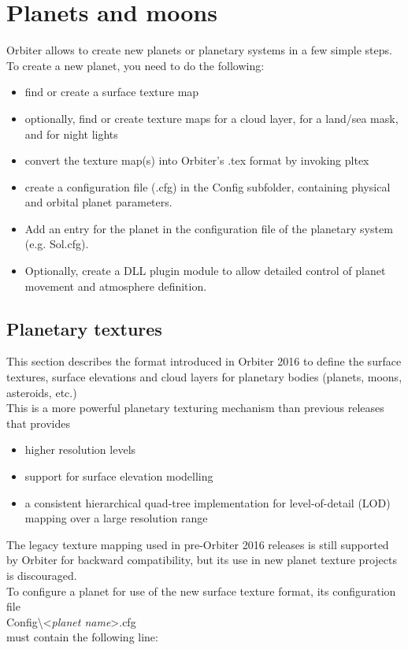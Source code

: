 \documentclass[Orbiter Developer Manual.tex]{subfiles}
\begin{document}
\section{Planets and moons}
Orbiter allows to create new planets or planetary systems in a few simple steps. To create a new planet, you need to do the following:

\begin{itemize}
\item find or create a surface texture map
\item optionally, find or create texture maps for a cloud layer, for a land/sea mask, and for night lights
\item convert the texture map(s) into Orbiter's .tex format by invoking pltex
\item create a configuration file (.cfg) in the Config subfolder, containing physical and orbital planet parameters.
\item Add an entry for the planet in the configuration file of the planetary system (e.g. Sol.cfg).
\item Optionally, create a DLL plugin module to allow detailed control of planet movement and atmosphere definition.
\end{itemize}


\subsection{Planetary textures}
\label{ssec:planetery_tex}
This section describes the format introduced in Orbiter 2016 to define the surface textures, surface elevations and cloud layers for planetary bodies (planets, moons, asteroids, etc.)\\
This is a more powerful planetary texturing mechanism than previous releases that provides

\begin{itemize}
\item higher resolution levels
\item support for surface elevation modelling
\item a consistent hierarchical quad-tree implementation for level-of-detail (LOD) mapping over a large resolution range
\end{itemize}

\noindent
The legacy texture mapping used in pre-Orbiter 2016 releases is still supported by Orbiter for backward compatibility, but its use in new planet texture projects is discouraged.
\\
To configure a planet for use of the new surface texture format, its configuration file\\
\indent Config\textbackslash <\textit{planet name}>.cfg\\
must contain the following line:
\end{document}
